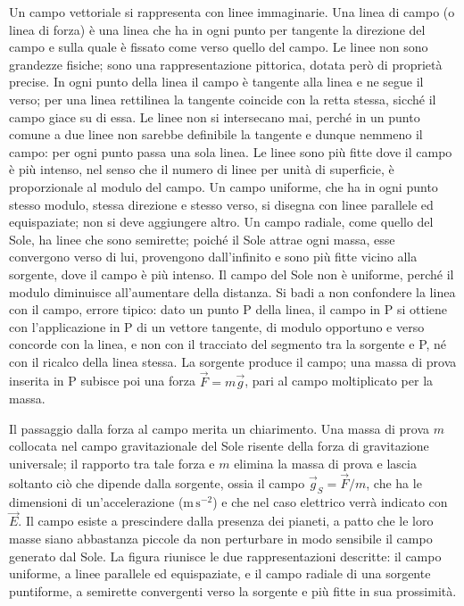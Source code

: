 \documentclass[main.tex]{subfiles}
\begin{document}
Un campo vettoriale si rappresenta con linee immaginarie. Una linea di campo (o linea di forza) è una linea che ha in ogni punto per tangente la direzione del campo e sulla quale è fissato come verso quello del campo. Le linee non sono grandezze fisiche; sono una rappresentazione pittorica, dotata però di proprietà precise. In ogni punto della linea il campo è tangente alla linea e ne segue il verso; per una linea rettilinea la tangente coincide con la retta stessa, sicché il campo giace su di essa. Le linee non si intersecano mai, perché in un punto comune a due linee non sarebbe definibile la tangente e dunque nemmeno il campo: per ogni punto passa una sola linea. Le linee sono più fitte dove il campo è più intenso, nel senso che il numero di linee per unità di superficie, è proporzionale al modulo del campo. Un campo uniforme, che ha in ogni punto stesso modulo, stessa direzione e stesso verso, si disegna con linee parallele ed equispaziate; non si deve aggiungere altro. Un campo radiale, come quello del Sole, ha linee che sono semirette; poiché il Sole attrae ogni massa, esse convergono verso di lui, provengono dall'infinito e sono più fitte vicino alla sorgente, dove il campo è più intenso. Il campo del Sole non è uniforme, perché il modulo diminuisce all'aumentare della distanza. Si badi a non confondere la linea con il campo, errore tipico: dato un punto P della linea, il campo in P si ottiene con l'applicazione in P di un vettore tangente, di modulo opportuno e verso concorde con la linea, e non con il tracciato del segmento tra la sorgente e P, né con il ricalco della linea stessa. La sorgente produce il campo; una massa di prova inserita in P subisce poi una forza $\vec F=m\vec g$, pari al campo moltiplicato per la massa.

Il passaggio dalla forza al campo merita un chiarimento. Una massa di prova $m$ collocata nel campo gravitazionale del Sole risente della forza di gravitazione universale; il rapporto tra tale forza e $m$ elimina la massa di prova e lascia soltanto ciò che dipende dalla sorgente, ossia il campo $\vec g_S=\vec F/m$, che ha le dimensioni di un'accelerazione ($\mathrm{m\,s^{-2}}$) e che nel caso elettrico verrà indicato con $\vec E$. Il campo esiste a prescindere dalla presenza dei pianeti, a patto che le loro masse siano abbastanza piccole da non perturbare in modo sensibile il campo generato dal Sole. La figura riunisce le due rappresentazioni descritte: il campo uniforme, a linee parallele ed equispaziate, e il campo radiale di una sorgente puntiforme, a semirette convergenti verso la sorgente e più fitte in sua prossimità.
\end{document}
